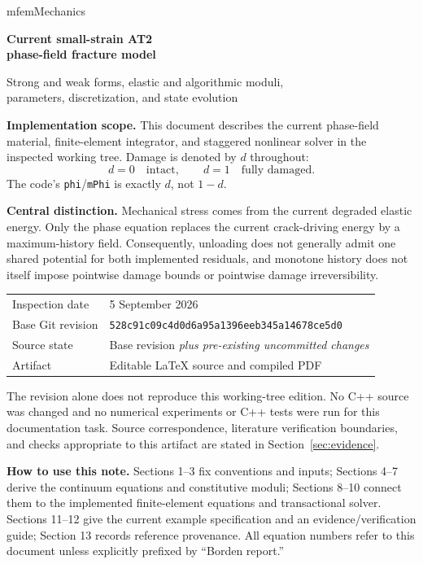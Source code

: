 \documentclass[11pt,a4paper]{article}
\newcommand{\code}[1]{\texttt{\small #1}}
\numberwithin{equation}{section}
\begin{document}
\hypersetup{pageanchor=false}
\begin{titlepage}
\vspace*{12mm}
{\Large\sffamily mfemMechanics\par}
\vspace{12mm}
{\huge\bfseries Current small-strain AT2\\[4pt]phase-field fracture model\par}
\vspace{7mm}
{\Large Strong and weak forms, elastic and algorithmic moduli,\\[3pt]parameters, discretization, and state evolution\par}
\vspace{12mm}
\textbf{Implementation scope.} This document describes the current phase-field
material, finite-element integrator, and staggered nonlinear solver in the
inspected working tree. Damage is denoted by $d$ throughout:
\[
 d=0\quad\text{intact},\qquad d=1\quad\text{fully damaged}.
\]
The code's \code{phi}/\code{mPhi} is exactly $d$, not $1-d$.

\textbf{Central distinction.} Mechanical stress comes from the current degraded
elastic energy. Only the phase equation replaces the current crack-driving
energy by a maximum-history field. Consequently, unloading does not generally
admit one shared potential for both implemented residuals, and monotone history
does not itself impose pointwise damage bounds or pointwise damage irreversibility.

\vfill
\begin{tabular}{@{}ll@{}}
Inspection date & 5 September 2026\\
Base Git revision & \code{528c91c09c4d0d6a95a1396eeb345a14678ce5d0}\\
Source state & Base revision \emph{plus pre-existing uncommitted changes}\\
Artifact & Editable \LaTeX{} source and compiled PDF
\end{tabular}

\vspace{6mm}
\small The revision alone does not reproduce this working-tree edition. No C++
source was changed and no numerical experiments or C++ tests were run for this
documentation task. Source correspondence, literature verification boundaries,
and checks appropriate to this artifact are stated in Section~\ref{sec:evidence}.
\end{titlepage}
\hypersetup{pageanchor=true}

\tableofcontents
\vfill
\textbf{How to use this note.} Sections 1--3 fix conventions and inputs;
Sections 4--7 derive the continuum equations and constitutive moduli;
Sections 8--10 connect them to the implemented finite-element equations and
transactional solver. Sections 11--12 give the current example specification
and an evidence/verification guide; Section 13 records reference provenance.
All equation numbers refer to this document
unless explicitly prefixed by ``Borden report.''
\end{document}
